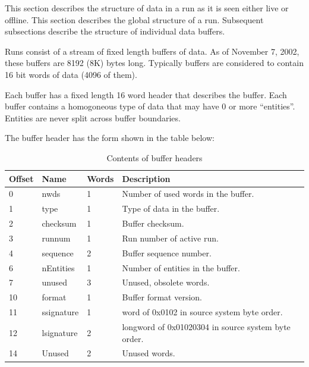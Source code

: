    This section describes the structure of data in a run as it is seen either
   live or offline. This section describes the global structure of a run. Subsequent
   subsections describe the structure of individual data buffers.
   
   Runs consist of a stream of fixed length buffers of data.  As of
   November 7, 2002, these buffers are 8192 (8K) bytes long.  Typically
   buffers are considered to contain 16 bit words of data (4096 of them).
   
   Each buffer has a fixed length 16 word header that describes the buffer.
   Each buffer contains a homogoneous type of data that may have 0 or 
   more ``entities''.  Entities are never split across buffer boundaries.
   
   The buffer header has the form shown in the table below:
   
   \begin{table}[htb]
      \caption{Contents of buffer headers}
      \begin{tabular}{|l|l|l|l|}
      \hline
      {\bf Offset} & {\bf Name} & {\bf Words} & {\bf Description} \\
      \hline
      0         & nwds  &  1     &  Number of used words in the buffer. \\
      1         & type   &  1     &  Type of data in the buffer. \\
      2         & checksum & 1 &  Buffer checksum. \\
      3         & runnum & 1    &  Run number of active run. \\
      4         & sequence & 2 & Buffer sequence number. \\
      6         & nEntities  & 1 & Number of entities in the buffer. \\
      7         & unused    & 3 & Unused, obsolete words. \\
      10       & format     & 1 & Buffer format version. \\
      11       & ssignature & 1 & word of 0x0102 in source system byte order. \\
      12       & lsignature & 2 & longword of 0x01020304 in source system byte order. \\
      14       & Unused    & 2 & Unused words. \\
      \hline
      \end{tabular}
   \end{table}
   
